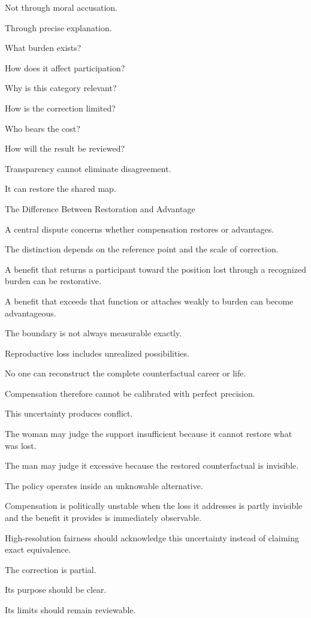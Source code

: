 Not through moral accusation.

Through precise explanation.

What burden exists?

How does it affect participation?

Why is this category relevant?

How is the correction limited?

Who bears the cost?

How will the result be reviewed?

Transparency cannot eliminate disagreement.

It can restore the shared map.

The Difference Between Restoration and Advantage

A central dispute concerns whether compensation restores or advantages.

The distinction depends on the reference point and the scale of correction.

A benefit that returns a participant toward the position lost through a recognized burden can be restorative.

A benefit that exceeds that function or attaches weakly to burden can become advantageous.

The boundary is not always measurable exactly.

Reproductive loss includes unrealized possibilities.

No one can reconstruct the complete counterfactual career or life.

Compensation therefore cannot be calibrated with perfect precision.

This uncertainty produces conflict.

The woman may judge the support insufficient because it cannot restore what was lost.

The man may judge it excessive because the restored counterfactual is invisible.

The policy operates inside an unknowable alternative.

Compensation is politically unstable when the loss it addresses is partly invisible and the benefit it provides is immediately observable.

High-resolution fairness should acknowledge this uncertainty instead of claiming exact equivalence.

The correction is partial.

Its purpose should be clear.

Its limits should remain reviewable.

